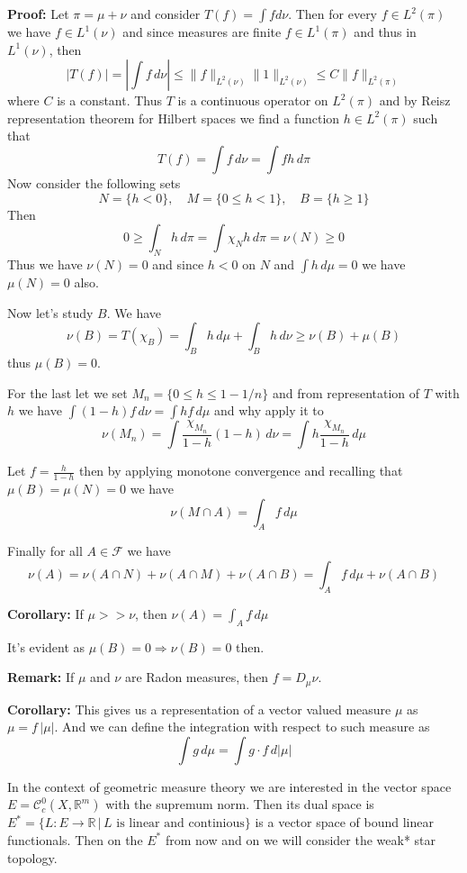 \documentclass{article}
\begin{document}
\vspace{1ex}
\textbf{Proof:} Let $\pi=\mu+\nu$ and consider $T(f)=\int fd\nu$. Then for
every $f\in L^2(\pi)$ we have $f\in L^1(\nu)$ and since measures are finite
$f\in L^1(\pi)$ and thus in $L^1(\nu)$, then
\[|T(f)|=|\int f\,d\nu|\leq\|f\|_{L^2(\nu)}\|1\|_{L^2(\nu)}\leq C\|f\|_{L^2(\pi)}\]
where $C$ is a constant. Thus $T$ is a continuous operator on $L^2(\pi)$ and by
Reisz representation theorem for Hilbert spaces we find a function $h\in L^2(\pi)$
such that
\[T(f)=\int f\,d\nu=\int fh\,d\pi\]
Now consider the following sets
\[N=\{h<0\},\quad M=\{0\leq h<1\},\quad B=\{h\geq 1\}\]
Then
\[0\geq\int_N h\,d\pi=\int\chi_N h\,d\pi=\nu(N)\geq 0\]
Thus we have $\nu(N)=0$ and since $h<0$ on $N$ and $\int h\,d\mu=0$ we have
$\mu(N)=0$ also.

\vspace{1ex}
Now let's study $B$. We have
\[\nu(B)=T(\chi_B)=\int_Bh\,d\mu+\int_B h\,d\nu\geq\nu(B)+\mu(B)\]
thus $\mu(B)=0$.

For the last let we set $M_n=\{0\leq h\leq1-1/n\}$ and from representation of
$T$ with $h$ we have $\int(1-h)f\,d\nu=\int hf\,d\mu$ and why apply it to
\[\nu(M_n)=\int\frac{\chi_{M_n}}{1-h}(1-h)\,d\nu=\int h\frac{\chi_{M_n}}{1-h}\,d\mu\]

Let $f=\frac{h}{1-h}$ then by applying monotone convergence and recalling that
$\mu(B)=\mu(N)=0$ we have
\[\nu(M\cap A)=\int_A f\,d\mu\]

Finally for all $A\in\mathcal F$ we have
\[\nu(A)=\nu(A\cap N)+\nu(A\cap M)+\nu(A\cap B) = \int_A f\,d\mu+\nu(A\cap B)\]

\vspace{2ex}
\textbf{Corollary:} If $\mu >> \nu$, then $\nu(A)=\int_A f\,d\mu$

\vspace{1ex}
It's evident as $\mu(B)=0\Rightarrow\nu(B)=0$ then. 

\vspace{2ex}
\textbf{Remark:} If $\mu$ and $\nu$ are Radon measures, then $f=D_\mu\nu$.

\vspace{2ex}
\textbf{Corollary:}
This gives us a representation of a vector valued measure $\mu$ as $\mu=f\,|\mu|$.
And we can define the integration with respect to such measure as
\[
\int g\,d\mu = \int g\cdot f\,d|\mu|
\]

\vspace{2ex}
In the context of geometric measure theory we are interested in the vector
space $E=\mathcal{C}^0_c(X, \mathbb{R}^m)$ with the supremum norm.
Then its dual space is $E^*=\{L:E\rightarrow\mathbb{R}\,|\,L\text{ is linear
and continious}\}$ is a vector space of bound linear functionals. Then on the $E^*$ from 
now and on we will consider the weak* star topology.
\end{document}

